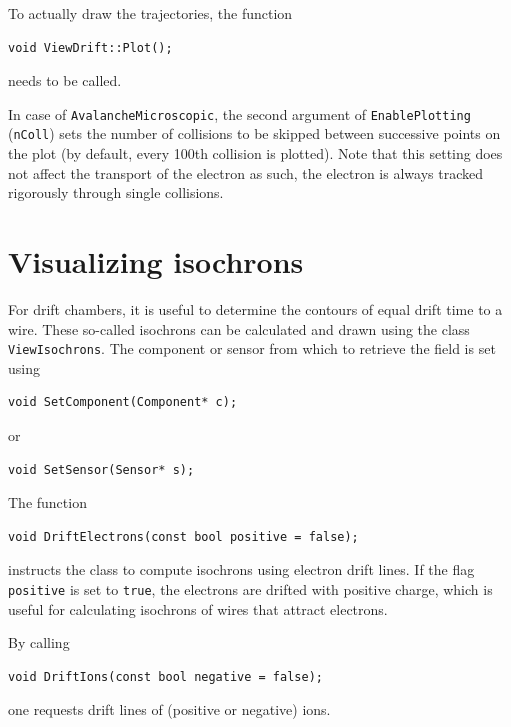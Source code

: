To actually draw the trajectories, the function 
\begin{lstlisting}
void ViewDrift::Plot();
\end{lstlisting}
needs to be called.

In case of \texttt{AvalancheMicroscopic}, the second argument of 
\texttt{EnablePlotting} (\texttt{nColl}) sets the number of 
collisions to be skipped between successive points on the plot 
(by default, every 100th collision is plotted). 
Note that this setting does not affect the transport of the electron as such, 
the electron is always tracked rigorously through single collisions.

\section{Visualizing isochrons}

For drift chambers, it is useful to determine the contours of equal drift time to a wire.
These so-called isochrons can be calculated and drawn 
using the class \texttt{ViewIsochrons}.
The component or sensor from which to retrieve the field is set using
\begin{lstlisting}
void SetComponent(Component* c);
\end{lstlisting}
or
\begin{lstlisting}
void SetSensor(Sensor* s);
\end{lstlisting}

The function
\begin{lstlisting}
void DriftElectrons(const bool positive = false);
\end{lstlisting}
instructs the class to compute isochrons using electron drift lines.
If the flag \texttt{positive} is set to \texttt{true}, the electrons 
are drifted with positive charge,
which is useful for calculating isochrons of wires that attract electrons.

By calling
\begin{lstlisting}
void DriftIons(const bool negative = false);
\end{lstlisting}
one requests drift lines of (positive or negative) ions.

